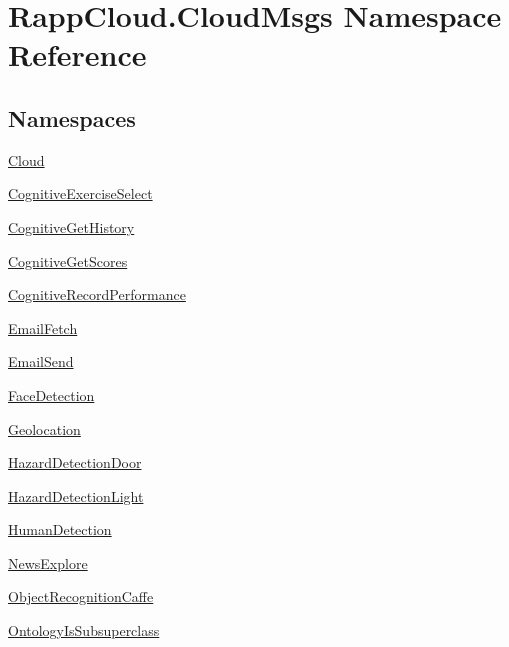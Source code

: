 \hypertarget{namespaceRappCloud_1_1CloudMsgs}{\section{Rapp\-Cloud.\-Cloud\-Msgs Namespace Reference}
\label{namespaceRappCloud_1_1CloudMsgs}
}
\subsection*{Namespaces}
\begin{DoxyCompactItemize}
\item 
\hyperlink{namespaceRappCloud_1_1CloudMsgs_1_1Cloud}{Cloud}
\item 
\hyperlink{namespaceRappCloud_1_1CloudMsgs_1_1CognitiveExerciseSelect}{Cognitive\-Exercise\-Select}
\item 
\hyperlink{namespaceRappCloud_1_1CloudMsgs_1_1CognitiveGetHistory}{Cognitive\-Get\-History}
\item 
\hyperlink{namespaceRappCloud_1_1CloudMsgs_1_1CognitiveGetScores}{Cognitive\-Get\-Scores}
\item 
\hyperlink{namespaceRappCloud_1_1CloudMsgs_1_1CognitiveRecordPerformance}{Cognitive\-Record\-Performance}
\item 
\hyperlink{namespaceRappCloud_1_1CloudMsgs_1_1EmailFetch}{Email\-Fetch}
\item 
\hyperlink{namespaceRappCloud_1_1CloudMsgs_1_1EmailSend}{Email\-Send}
\item 
\hyperlink{namespaceRappCloud_1_1CloudMsgs_1_1FaceDetection}{Face\-Detection}
\item 
\hyperlink{namespaceRappCloud_1_1CloudMsgs_1_1Geolocation}{Geolocation}
\item 
\hyperlink{namespaceRappCloud_1_1CloudMsgs_1_1HazardDetectionDoor}{Hazard\-Detection\-Door}
\item 
\hyperlink{namespaceRappCloud_1_1CloudMsgs_1_1HazardDetectionLight}{Hazard\-Detection\-Light}
\item 
\hyperlink{namespaceRappCloud_1_1CloudMsgs_1_1HumanDetection}{Human\-Detection}
\item 
\hyperlink{namespaceRappCloud_1_1CloudMsgs_1_1NewsExplore}{News\-Explore}
\item 
\hyperlink{namespaceRappCloud_1_1CloudMsgs_1_1ObjectRecognitionCaffe}{Object\-Recognition\-Caffe}
\item 
\hyperlink{namespaceRappCloud_1_1CloudMsgs_1_1OntologyIsSubsuperclass}{Ontology\-Is\-Subsuperclass}

\end{DoxyCompactItemize}

